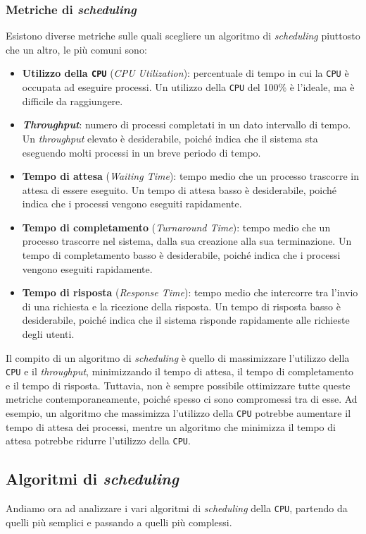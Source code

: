     \subsubsection{Metriche di \textit{scheduling}}
        Esistono diverse metriche sulle quali scegliere un algoritmo di \textit{scheduling} piuttosto che un altro, le più comuni sono:
        \begin{itemize}
            \item \textbf{Utilizzo della \texttt{CPU}} (\textit{CPU Utilization}): percentuale di tempo in cui la \texttt{CPU} è occupata ad eseguire processi. Un utilizzo della \texttt{CPU} del 100\% è l'ideale, ma è difficile da raggiungere.
            \item \textbf{\textit{Throughput}}: numero di processi completati in un dato intervallo di tempo. Un \textit{throughput} elevato è desiderabile, poiché indica che il sistema sta eseguendo molti processi in un breve periodo di tempo.
            \item \textbf{Tempo di attesa} (\textit{Waiting Time}): tempo medio che un processo trascorre in attesa di essere eseguito. Un tempo di attesa basso è desiderabile, poiché indica che i processi vengono eseguiti rapidamente.
            \item \textbf{Tempo di completamento} (\textit{Turnaround Time}): tempo medio che un processo trascorre nel sistema, dalla sua creazione alla sua terminazione. Un tempo di completamento basso è desiderabile, poiché indica che i processi vengono eseguiti rapidamente.
            \item \textbf{Tempo di risposta} (\textit{Response Time}): tempo medio che intercorre tra l'invio di una richiesta e la ricezione della risposta. Un tempo di risposta basso è desiderabile, poiché indica che il sistema risponde rapidamente alle richieste degli utenti.
        \end{itemize}
        Il compito di un algoritmo di \textit{scheduling} è quello di massimizzare l'utilizzo della \texttt{CPU} e il \textit{throughput}, minimizzando il tempo di attesa, il tempo di completamento e il tempo di risposta. Tuttavia, non è sempre possibile ottimizzare tutte queste metriche contemporaneamente, poiché spesso ci sono compromessi tra di esse. Ad esempio, un algoritmo che massimizza l'utilizzo della \texttt{CPU} potrebbe aumentare il tempo di attesa dei processi, mentre un algoritmo che minimizza il tempo di attesa potrebbe ridurre l'utilizzo della \texttt{CPU}.
    \subsection{Algoritmi di \textit{scheduling}}
        Andiamo ora ad analizzare i vari algoritmi di \textit{scheduling} della \texttt{CPU}, partendo da quelli più semplici e passando a quelli più complessi.
